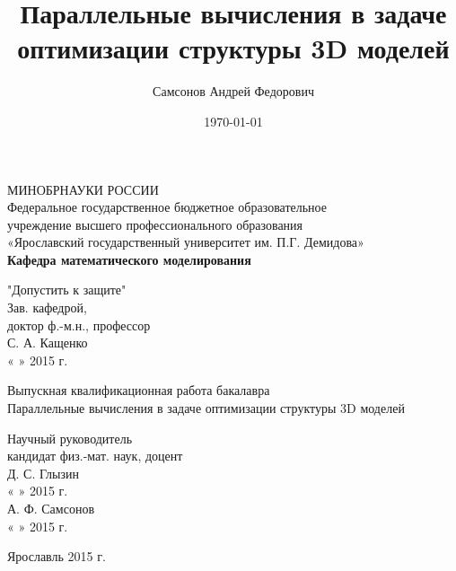 \title{Параллельные вычисления в задаче оптимизации структуры 3D моделей}
\author{Самсонов Андрей Федорович}
\date{\today}

\titlepage
\begin{center}
МИНОБРНАУКИ РОССИИ\\
\vspace{0.5cm}
Федеральное государственное бюджетное образовательное\\
учреждение высшего профессионального образования\\
«Ярославский государственный университет им. П.Г. Демидова»\\
\vspace{0.5cm}
{\bf Кафедра математического моделирования}\\
\end{center}

\begin{flushright}
"Допустить к защите"\\
Зав. кафедрой,\\
доктор ф.-м.н., профессор\\
\underline{\phantom{aaaaaaaaaaaa}} С. А. Кащенко\\
«
\underline{\phantom{aaa}}
»
\underline{\phantom{aaaaaaaaaaaaa}} 2015 г.\\
\end{flushright}

\begin{center}
\vspace{3cm}
Выпускная квалификационная работа бакалавра\\
\vspace{0.5cm}
Параллельные вычисления в задаче оптимизации структуры 3D моделей\\
\vspace{3cm}
\end{center}

\begin{flushright}
Научный руководитель\\
кандидат физ.-мат. наук, доцент\\
\underline{\phantom{aaaaaa}} Д. С. Глызин\\
«
\underline{\phantom{aaa}}
»
\underline{\phantom{aaaaaaaaaaaaa}} 2015 г.\\
\vspace{0.5cm}
\underline{\phantom{aaaaaaaaaaa}} А. Ф. Самсонов\\
«
\underline{\phantom{aaa}}
»
\underline{\phantom{aaaaaaaaaaaaaa}}2015 г.\\
\vspace{4.0cm}
\begin{center}
Ярославль 2015 г.
\end{center}
\end{flushright}